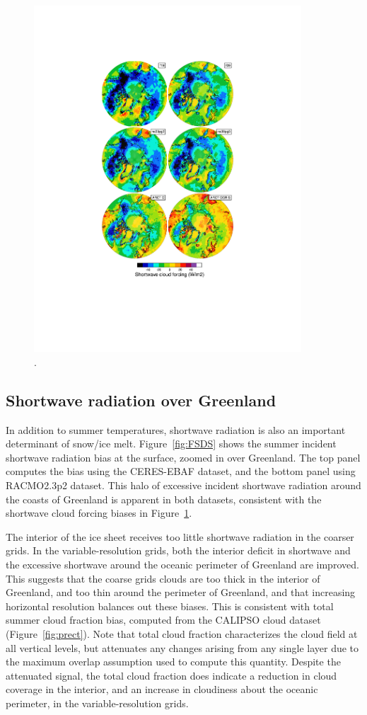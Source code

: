 \documentclass[draft]{agujournal2019}
\begin{document}
\begin{figure}[t]
\begin{center}
         \includegraphics[width=100mm]{figs/temp_contours_diffCERES_SWCF.pdf}
\end{center}
\caption{.}
\label{fig:SWCF}
\end{figure}

\subsection{Shortwave radiation over Greenland}

In addition to summer temperatures, shortwave radiation is also an important determinant of snow/ice melt. Figure~\ref{fig:FSDS} shows the summer incident shortwave radiation bias at the surface, zoomed in over Greenland. The top panel computes the bias using the CERES-EBAF dataset, and the bottom panel using RACMO2.3p2 dataset.
This halo of excessive incident shortwave radiation around the coasts of Greenland is apparent in both datasets, consistent with the shortwave cloud forcing biases in Figure~\ref{fig:SWCF}.

The interior of the ice sheet receives too little shortwave radiation in the coarser grids. In the variable-resolution grids, both the interior deficit in shortwave and the excessive shortwave around the oceanic perimeter of Greenland are improved. This suggests that the coarse grids clouds are too thick in the interior of Greenland, and too thin around the perimeter of Greenland, and that increasing horizontal resolution balances out these biases. This is consistent with total summer cloud fraction bias, computed from the CALIPSO cloud dataset (Figure~\ref{fig:prect}). Note that total cloud fraction characterizes the cloud field at all vertical levels, but attenuates any changes arising from any single layer due to the maximum overlap assumption used to compute this quantity. Despite the attenuated signal, the total cloud fraction does indicate a reduction in cloud coverage in the interior, and an increase in cloudiness about the oceanic perimeter, in the variable-resolution grids. 
\end{document}
